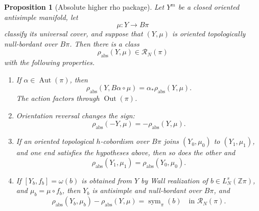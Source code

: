 \documentclass[10pt,reqno]{amsart}
\numberwithin{equation}{section}
\newtheorem{proposition}{Proposition}
\theoremstyle{definition}
\theoremstyle{remark}
\newcommand{\Z}{\mathbb Z}
\newcommand{\Aut}{\operatorname{Aut}}
\newcommand{\Out}{\operatorname{Out}}
\newcommand{\cR}{\mathcal R}
\newcommand{\rhoabs}{\rho_{\mathrm{abs}}}
\begin{document}
\begin{proposition}[Absolute higher rho package]
\label{prop:absolute-rho-package}
Let \(Y^m\) be a closed oriented antisimple manifold, let
\[
\mu\colon Y\longrightarrow B\pi
\]
classify its universal cover, and suppose that \((Y,\mu)\) is
oriented topologically null-bordant over \(B\pi\).  Then there is a class
\[
\rhoabs(Y,\mu)\in\cR_N(\pi)
\]
with the following properties.
\begin{enumerate}[label=\textup{(\roman*)}]
\item If \(\alpha\in\Aut(\pi)\), then
\begin{equation}\label{eq:absolute-rho-naturality}
\rhoabs(Y,B\alpha\circ\mu)
=
\alpha_*\rhoabs(Y,\mu).
\end{equation}
The action factors through \(\Out(\pi)\).

\item Orientation reversal changes the sign:
\begin{equation}\label{eq:absolute-rho-orientation}
\rhoabs(-Y,\mu)=-\rhoabs(Y,\mu).
\end{equation}

\item If an oriented topological \(h\)-cobordism over \(B\pi\) joins
\((Y_0,\mu_0)\) to \((Y_1,\mu_1)\), and one end satisfies the
hypotheses above, then so does the other and
\[
\rhoabs(Y_1,\mu_1)=\rhoabs(Y_0,\mu_0).
\]

\item If \([Y_b,f_b]=\omega(b)\) is obtained from \(Y\) by Wall
realization of \(b\in L_N^s(\Z\pi)\), and
\(\mu_b=\mu\circ f_b\), then \(Y_b\) is antisimple and
null-bordant over \(B\pi\), and
\begin{equation}\label{eq:odd-rho-wall-package}
\rhoabs(Y_b,\mu_b)-\rhoabs(Y,\mu)
=
\operatorname{sym}_\pi(b)
\quad\text{in }\cR_N(\pi).
\end{equation}
\end{enumerate}
\end{proposition}
\end{document}
